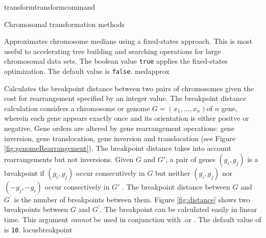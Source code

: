 \begin{command}{transform}{transformcommand}
\begin{arguments}
\begin{argumentgroup}{Chromosomal transformation methods}
	\begin{description}
            
                        {Approximates chromosome medians using a fixed-states
                        approach. This is most useful to accelerating tree
                        building and searching operations for large chromosomal
                        data sets. The boolean value \texttt{true} applies the
                        fixed-states optimization. The default value is
                        \texttt{false}.}
                        {medapprox}
                        
                        {Calculates the breakpoint distance \cite{blanchetteetal1997}
                        between two pairs of chromosomes given the cost for rearrangement
                        specified by an integer value.  The breakpoint distance calculation considers
                        a chromosome or genome $G = (x_1, \ldots, x_n)$of $n$ gene, wherein each
                        gene appears exactly once and its orientation is either positve or negative.  Gene
                        orders are altered by gene rearrangement operations: gene inversion, gene translocation,
                        gene inversion and translocation (see Figure \ref{fig:genomeRearrangement}).  
                        The breakpoint distance takes into account rearrangements but not inversions.
                        Given $G$ and $G'$, a pair of genes $(g_i, g_j)$ is a breakpoint if $(g_i, g_j)$ occur 
                        consecutively in $G$ but neither $(g_i, g_j)$ nor $(-g_j, -g_i)$ occur
                        consectively in $G'$  \cite{sankoffandblanchette1998}.  The breakpoint distance between $G$
		     and $G^\prime$ is the number of breakpoints between them.  Figure \ref{fig:distance} 
                        shows two breakpoints between $G$ and $G^\prime$. The breakpoint can be calculated 
                        easily in linear time.  This argument \emph{cannot} be used in
                        conjunction with .or
                        . The default
                        value of  is \texttt{10}.} 
                        {locusbreakpoint} 
                        

\end{description}
\end{argumentgroup}
\end{arguments}
\end{command}
